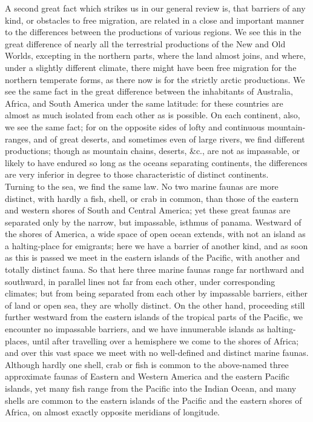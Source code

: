 \indent A second great fact which strikes us in our general review is, that barriers of any kind, or obstacles to free migration, are related in a close and important manner to the differences between the productions of various regions.  We see this in the great difference of nearly all the terrestrial productions of the New and Old Worlds, excepting in the northern parts, where the land almost joins, and where, under a slightly different climate, there might have been free migration for the northern temperate forms, as there now is for the strictly arctic productions. We see the same fact in the great difference between the inhabitants of Australia, Africa, and South America under the same latitude: for these countries are almost as much isolated from each other as is possible. On each continent, also, we see the same fact; for on the opposite sides of lofty and continuous mountain-ranges, and of great deserts, and sometimes even of large rivers, we find different productions; though as mountain chains, deserts, \&c., are not as impassable, or likely to have endured so long as the oceans separating continents, the differences are very inferior in degree to those characteristic of distinct continents.~\\
\indent Turning to the sea, we find the same law. No two marine faunas are more distinct, with hardly a fish, shell, or crab in common, than those of the eastern and western shores of South and Central America; yet these great faunas are separated only by the narrow, but impassable, isthmus of panama. Westward of the shores of America, a wide space of open ocean extends, with not an island as a halting-place for emigrants; here we have a barrier of another kind, and as soon as this is passed we meet in the eastern islands of the Pacific, with another and totally distinct fauna. So that here three marine faunas range far northward and southward, in parallel lines not far from each other, under corresponding climates; but from being separated from each other by impassable barriers, either of land or open sea, they are wholly distinct. On the other hand, proceeding still further westward from the eastern islands of the tropical parts of the Pacific, we encounter no impassable barriers, and we have innumerable islands as halting-places, until after travelling over a hemisphere we come to the shores of Africa; and over this vast space we meet with no well-defined and distinct marine faunas. Although hardly one shell, crab or fish is common to the above-named three approximate faunas of Eastern and Western America and the eastern Pacific islands, yet many fish range from the Pacific into the Indian Ocean, and many shells are common to the eastern islands of the Pacific and the eastern shores of Africa, on almost exactly opposite meridians of longitude.~\\
